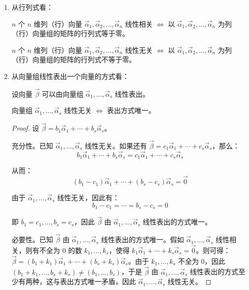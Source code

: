 \begin{enumerate}
	\item 从行列式看：

	$n$ 个 $n$ 维列（行）向量 $\vec \alpha_1, \vec \alpha_2, \ldots, \vec \alpha_n$ 线性相关 $\Longleftrightarrow$ 以 $\vec \alpha_1, \vec \alpha_2, \ldots, \vec \alpha_n$ 为列（行）向量组的矩阵的行列式等于零。

	$n$ 个 $n$ 维列（行）向量 $\vec \alpha_1, \vec \alpha_2, \ldots, \vec \alpha_n$ 线性无关 $\Longleftrightarrow$ 以 $\vec \alpha_1, \vec \alpha_2, \ldots, \vec \alpha_n$ 为列（行）向量组的矩阵的行列式不等于零。

	\item 从向量组线性表出一个向量的方式看：

	设向量 $\vec \beta$ 可以由向量组 $\vec \alpha_1, \ldots, \vec \alpha_s$ 线性表出。

	向量组 $\vec \alpha_1, \ldots, \vec \alpha_s$ 线性无关 $\Longleftrightarrow$ 表出方式唯一。

	\begin{proof}
		设 $\vec \beta = b_1 \vec \alpha_1 + \cdots + b_s \vec \alpha_s$。

		\bigskip

		充分性。已知 $\vec \alpha_1, \ldots, \vec \alpha_s$ 线性无关。如果还有 $\vec \beta = c_1 \vec \alpha_1 + \cdots + c_s \vec \alpha_s$，那么：
		$$
		b_1 \vec \alpha_1 + \cdots + b_s \vec \alpha_s = c_1 \vec \alpha_1 + \cdots + c_s \vec \alpha_s
		$$

		从而：
		$$
		(b_1 - c_1) \vec \alpha_1 + \cdots + (b_s - c_s) \vec \alpha_s = \vec 0
		$$

		由于 $\vec \alpha_1, \ldots, \vec \alpha_s$ 线性无关，因此有：
		$$
		b_1 - c_1 = \cdots = b_s - c_s = 0
		$$

		即 $b_1 = c_1, \ldots, b_s = c_s$，因此 $\vec \beta$ 由 $\vec \alpha_1, \ldots, \vec \alpha_s$ 线性表出的方式唯一。

		\bigskip

		必要性。已知 $\vec \beta$ 由 $\vec \alpha_1, \ldots, \vec \alpha_s$ 线性表出的方式唯一。假如 $\vec \alpha_1, \ldots, \vec \alpha_s$ 线性相关，则有不全为 $0$ 的数 $k_1, \ldots, k_s$，使得 $k_1 \vec \alpha_1 + \cdots + k_s \vec \alpha_s = \vec 0$。则可得：$\vec \beta = (b_1 + k_1) \vec \alpha_1 + \cdots + (b_s + k_s) \vec \alpha_s$。由于 $k_1, \ldots, k_s$  不全为 $0$，因此 $(b_1 + k_1, \ldots, b_s + k_s) \ne (b_1, \ldots, b_s)$，于是 $\vec \beta$ 由 $\vec \alpha_1, \ldots, \vec \alpha_s$ 线性表出的方式至少有两种，这与表出方式唯一矛盾，因此 $\vec \alpha_1, \ldots, \vec \alpha_s$ 线性无关。
	\end{proof}


\end{enumerate}
